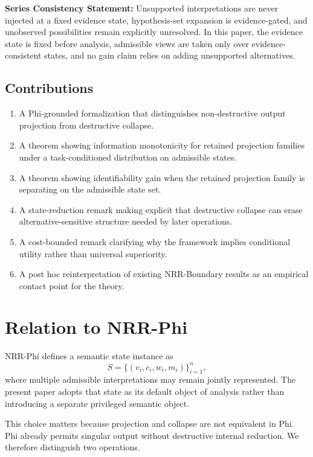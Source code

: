 \documentclass[11pt,a4paper]{article}
\begin{document}
\textbf{Series Consistency Statement:}
Unsupported interpretations are never injected at a fixed evidence state, hypothesis-set expansion is evidence-gated, and unobserved possibilities remain explicitly unresolved. In this paper, the evidence state is fixed before analysis, admissible views are taken only over evidence-consistent states, and no gain claim relies on adding unsupported alternatives.

\subsection{Contributions}

\begin{enumerate}
  \item A Phi-grounded formalization that distinguishes non-destructive output projection from destructive collapse.
  \item A theorem showing information monotonicity for retained projection families under a task-conditioned distribution on admissible states.
  \item A theorem showing identifiability gain when the retained projection family is separating on the admissible state set.
  \item A state-reduction remark making explicit that destructive collapse can erase alternative-sensitive structure needed by later operations.
  \item A cost-bounded remark clarifying why the framework implies conditional utility rather than universal superiority.
  \item A post hoc reinterpretation of existing NRR-Boundary results \cite{saito2026boundary} as an empirical contact point for the theory.
\end{enumerate}

\section{Relation to NRR-Phi}
\label{sec:phi}

NRR-Phi \cite{saito2026phi} defines a semantic state instance as
\begin{equation}
S = \{(v_i, c_i, w_i, m_i)\}_{i=1}^{n},
\end{equation}
where multiple admissible interpretations may remain jointly represented. The present paper adopts that state as its default object of analysis rather than introducing a separate privileged semantic object.

This choice matters because projection and collapse are not equivalent in Phi. Phi already permits singular output without destructive internal reduction. We therefore distinguish two operations.
\end{document}
